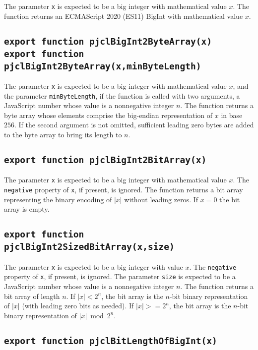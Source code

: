 \documentclass[12pt]{article}
\begin{document}
The parameter {\tt x} is expected to be a big integer with mathematical value $x$.
The function returns an ECMAScript 2020 (ES11) BigInt with mathematical value $x$.

\subsection{\tt export function pjclBigInt2ByteArray(x)\\export function pjclBigInt2ByteArray(x,minByteLength)}

The parameter {\tt x} is expected to be a big integer with mathematical value $x$,
and the parameter {\tt minByteLength}, if the function is called with two
arguments, a JavaScript number whose value is a nonnegative integer $n$.
The function returns a byte array whose elements comprise the big-endian 
representation of $x$ in base $256$.  If the second argument is not omitted,
sufficient leading zero bytes are added to the byte array to bring its length
to $n$.

\subsection{\tt export function pjclBigInt2BitArray(x)}

The parameter {\tt x} is expected to be a big integer with mathematical value $x$.
The {\tt negative} property of {\tt x}, if present, is ignored.
The function returns a bit array representing the binary encoding of
$|x|$ without leading zeros.
If $x = 0$ the bit array is empty.

\subsection{\tt export function pjclBigInt2SizedBitArray(x,size)}

The parameter {\tt x} is expected to be a big integer with
value $x$.
The {\tt negative} property of {\tt x}, if present, is ignored.
The parameter {\tt size} is expected to be a JavaScript number whose
value is a nonnegative integer $n$.  The function returns a bit array
of length $n$.  If $|x| < 2^n$, the
bit array is the $n$-bit binary representation of $|x|$ (with leading zero bits as needed).  If $|x| >= 2^n$,
the bit array is the $n$-bit binary representation of $|x| \bmod 2^n$.

\subsection{\tt export function pjclBitLengthOfBigInt(x)}
\end{document}
